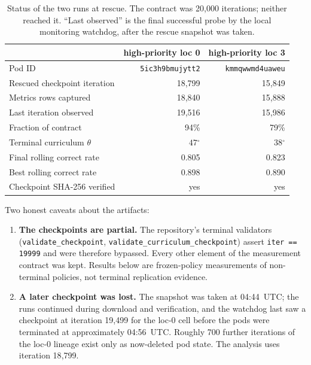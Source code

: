 \documentclass[11pt]{article}
\newcommand{\dg}{\ensuremath{^\circ}}
\begin{document}
\begin{table}[h]
\centering\small
\caption{Status of the two runs at rescue. The contract was 20{,}000 iterations; neither
reached it. ``Last observed'' is the final successful probe by the local monitoring
watchdog, after the rescue snapshot was taken.}
\label{tab:provenance}
\begin{tabular}{lrr}
\toprule
 & \textbf{high-priority loc 0} & \textbf{high-priority loc 3} \\
\midrule
Pod ID                        & \texttt{5ic3h9bmujytt2} & \texttt{kmmqwwmd4uaweu} \\
Rescued checkpoint iteration  & 18{,}799 & 15{,}849 \\
Metrics rows captured         & 18{,}840 & 15{,}888 \\
Last iteration observed       & 19{,}516 & 15{,}986 \\
Fraction of contract          & 94\% & 79\% \\
Terminal curriculum $\theta$  & $47\dg$ & $38\dg$ \\
Final rolling correct rate    & 0.805 & 0.823 \\
Best rolling correct rate     & 0.898 & 0.890 \\
Checkpoint SHA-256 verified   & yes & yes \\
\bottomrule
\end{tabular}
\end{table}

Two honest caveats about the artifacts:

\begin{enumerate}[leftmargin=1.4em,itemsep=2pt]
\item \textbf{The checkpoints are partial.} The repository's terminal validators
(\texttt{validate\_checkpoint}, \texttt{validate\_curriculum\_checkpoint}) assert
\texttt{iter == 19999} and were therefore bypassed. Every other element of the
measurement contract was kept. Results below are frozen-policy measurements of
non-terminal policies, not terminal replication evidence.
\item \textbf{A later checkpoint was lost.} The snapshot was taken at 04:44~UTC; the runs
continued during download and verification, and the watchdog last saw a checkpoint at
iteration 19{,}499 for the loc-0 cell before the pods were terminated at approximately
04:56~UTC. Roughly 700 further iterations of the loc-0 lineage exist only as
now-deleted pod state. The analysis uses iteration 18{,}799.
\end{enumerate}
\end{document}
